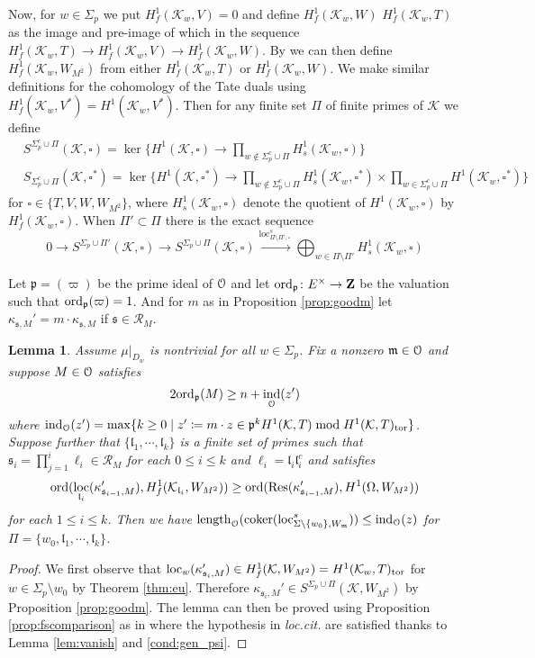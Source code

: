 \documentclass[leqno]{amsart}
\newtheorem{lem}[thm]{Lemma}
\theoremstyle{definition}
\theoremstyle{remark}
\newcommand{\eo}{\EuScript{O}}
\newcommand{\Z}{{\mathbf{Z}}}
\DeclareMathOperator{\Res}{Res}
\DeclareMathOperator{\coker}{coker}
\DeclareMathOperator{\ind}{ind} %
\DeclareMathOperator{\length}{length}
\newcommand{\fl}{\mathfrak{l}}
\newcommand{\fm}{\mathfrak{m}}
\newcommand{\fp}{\mathfrak{p}}
\newcommand{\fs}{\mathfrak{s}}
\newcommand{\K}{{\mathcal{K}}} %
\newcommand{\ord}{\textnormal{ord}} %
\DeclareMathOperator{\loc}{loc}
\begin{document}
Now, for $w\in \Sigma_p$ 
we put $H^1_f(\K_w, V)=0$
and define $H^1_f(\K_w, W)$ $H^1_f(\K_w, T)$
as the image and pre-image of which in the sequence
$H^1_f(\K_w, T)\to H^1_f(\K_w, V)\to H^1_f(\K_w, W)$.
By \cite[Lem 1.3.8]{Rubin}
we can then define $H^1_f(\K_w, W_{M^2})$
from either $H^1_f(\K_w, T)$ or $H^1_f(\K_w, W)$.
We make similar definitions for the cohomology of the Tate duals
using $H^1_f(\K_w, V^*)=H^1(\K_w, V^*)$.
Then for any finite set $\Pi$ of finite primes of $\K$ we define
\begin{align*}
    &S^{\Sigma_p^c\cup \Pi}(\K, \square)=
    \ker\big\{
    H^1(\K, \square)\to \prod_{w\notin \Sigma_p^c\cup \Pi}H^1_s(\K_w, \square)
    \big\}\\
    &S_{\Sigma_p^c\cup \Pi}(\K, \square^*)=
    \ker\big\{
    H^1(\K, \square^*)\to \prod_{w\notin \Sigma_p^c\cup \Pi}H^1_s(\K_w, \square^*)
    \times \prod_{w\in\Sigma_p^c\cup \Pi}H^1(\K_w,\square^*)
    \big\}
\end{align*}
for $\square\in \{T,V,W,W_{M^2}\}$, where $H^1_s(\K_w,\square)$
denote the quotient of $H^1(\K_w,\square)$ by $H^1_f(\K_w,\square)$.
When $\Pi'\subset \Pi$ there is the exact sequence
\[
    0\to
    S^{\Sigma_p\cup \Pi'}(\K, \square)\to
    S^{\Sigma_p\cup \Pi}(\K, \square)
    \xrightarrow{\loc_{\Pi\setminus\Pi',\square}^s}
    \bigoplus_{w\in\Pi\setminus\Pi'}H^1_s(\K_w, \square)
\]

Let $\fp=(\varpi)$ be the prime ideal of $\eo$
and let $\ord_\fp\colon E^\times\to \Z$ be the valuation 
such that $\ord_\fp(\varpi)=1$.
And for $m$ as in Proposition \ref{prop:goodm}
let $\kappa_{\fs,M}'=m\cdot \kappa_{\fs,M}$
if $\fs\in \mathcal{R}_M$.

\begin{lem}
Assume $\mu\vert_{D_w}$ is nontrivial for all $w\in\Sigma_p$.
Fix a nonzero $\fm\in \eo$ and suppose $M\in \eo$ satisfies
\[
    2\ord_\fp(M)\geq n+\ind_\eo(z')
\]
where 
$\ind_\eo(z')=\max\{k\geq 0\mid z'\coloneqq m\cdot z\in 
\fp^k H^1(\K, T)\bmod H^1(\K,T)_{\textnormal{tor}}\}$.
Suppose further that $\{\fl_1,\cdots,\fl_k\}$ 
is a finite set of primes such that
$\fs_i=\prod_{j=1}^i\ell_i\in \mathcal{R}_M$
for each $0\leq i\leq k$ and $\ell_i=\fl_i\fl_i^c$ and satisfies 
\[
\textnormal{ord}( \loc_{\fl_i}(\kappa_{\fs_{i-1},M}'),
H^1_f(\K_{\fl_i}, W_{M^2}))\geq
\textnormal{ord}( \Res(\kappa_{\fs_{i-1},M}'), H^1(\Omega,W_{M^2}))
\]
for each $1\leq i\leq k$.
Then we have 
$\length_{\eo}(\coker(\loc_{\Sigma\setminus\{w_0\},W_{\fm}}^s))
\leq \ind_{\eo}(z)$
for $\Pi=\{w_0, \fl_1,\cdots, \fl_k\}$.
\end{lem}
\begin{proof}

We first observe that 
$\loc_w(\kappa_{\fs_i,M}')\in H^1_f(\K, W_{M^2})=H^1(\K_w, T)_{\textnormal{tor}}$
for $w\in\Sigma_p\setminus{w_0}$
by Theorem \ref{thm:eu}.
Therefore
$\kappa_{\fs_i,M}'\in S^{\Sigma_p\cup \Pi}(\K, W_{M^2})$
by Proposition \ref{prop:goodm}.
The lemma can then be proved 
using Proposition \ref{prop:fscomparison}
as in \cite[Lem 5.2.5]{Rubin}
where the hypothesis in \textit{loc.cit.}
are satisfied thanks to Lemma \ref{lem:vanish} and \eqref{cond:gen_psi}.

\end{proof}
\end{document}
